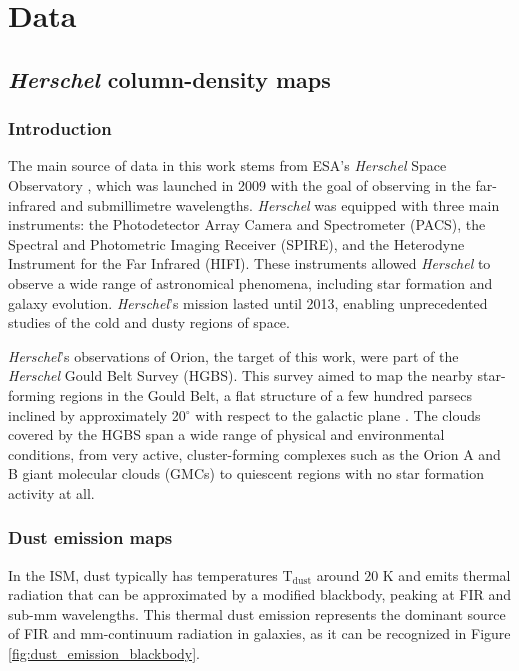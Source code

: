 \chapter{Data}
\label{chap:data}

\section{\textit{Herschel} column-density maps}
\subsection{Introduction}
The main source of data in this work stems from ESA's \textit{Herschel} Space Observatory \cite{pilbratt2010herschel}, which was launched in 2009 with the goal of observing in the far-infrared and submillimetre wavelengths. 
\textit{Herschel} was equipped with three main instruments: the Photodetector Array Camera and Spectrometer (PACS), the Spectral and Photometric Imaging Receiver (SPIRE), and the Heterodyne Instrument for the Far Infrared (HIFI). These instruments allowed \textit{Herschel} to observe a wide range of astronomical phenomena, including star formation and galaxy evolution.
\textit{Herschel}'s mission lasted until 2013, enabling unprecedented studies of the cold and dusty regions of space.

\textit{Herschel}'s observations of Orion, the target of this work, were part of the \textit{Herschel} Gould Belt Survey (HGBS). This survey aimed to map the nearby star-forming regions in the Gould Belt, a flat structure of a few hundred parsecs inclined by approximately 20$^{\circ}$ with respect to the galactic plane \cite{andre2010herschel}.
The clouds covered by the HGBS span a wide range of physical and environmental conditions, from very active, cluster-forming complexes such as the Orion A and B giant molecular clouds (GMCs) to quiescent regions with no star formation activity at all.

\subsection{Dust emission maps}
In the ISM, dust typically has temperatures T$_{\mathrm{dust}}$ around $20$ K and emits thermal radiation that can be approximated by a modified blackbody, peaking at FIR and sub-mm wavelengths. 
This thermal dust emission represents the dominant source of FIR and mm-continuum radiation in galaxies, as it can be recognized in Figure \ref{fig:dust_emission_blackbody}. 

